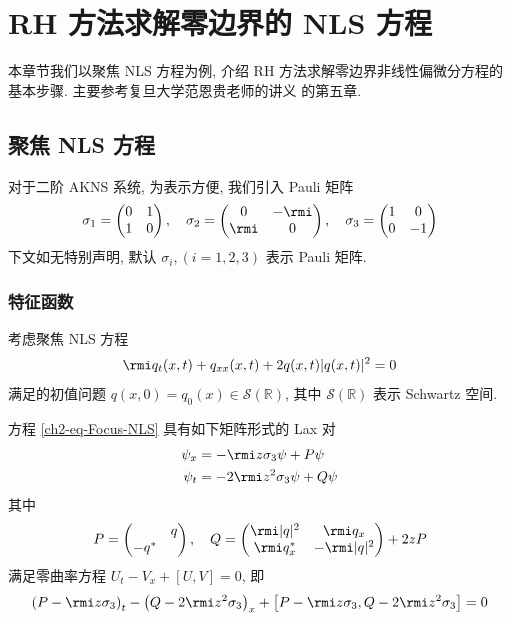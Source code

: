 \chapter{RH 方法求解零边界的 NLS 方程}\label{ch2-ZC-NLS}
本章节我们以聚焦 NLS 方程为例, 介绍 RH 方法求解零边界非线性偏微分方程的基本步骤. 主要参考复旦大学范恩贵老师的讲义 \cite{Fan-RH} 的第五章.
\section{聚焦 NLS 方程}
对于二阶 AKNS 系统, 为表示方便, 我们引入 Pauli 矩阵
\begin{equation}
    \sigma_{1} = \begin{pmatrix}
        0 & 1 \\
        1 & 0
    \end{pmatrix}, \quad
    \sigma_{2} = \begin{pmatrix}
        0    & -\rmi \\
        \rmi & 0
    \end{pmatrix}, \quad
    \sigma_{3} = \begin{pmatrix}
        1 & 0  \\
        0 & -1
    \end{pmatrix}
\end{equation}
下文如无特别声明, 默认 $ \sigma_{i}, (i = 1,2,3) $ 表示 Pauli 矩阵.
\subsection{特征函数}

考虑聚焦 NLS 方程
\begin{equation}
    \rmi q_{t}(x,t) + q_{xx}(x,t) + 2q(x,t)|q(x,t)|^{2} = 0 \label{ch2-eq-Focus-NLS}
\end{equation}
满足的初值问题 $q(x,0) = q_{0}(x) \in \mathcal{S}(\mathbb{R})$, 其中 $ \mathcal{S}(\mathbb{R}) $ 表示 Schwartz 空间.

方程 \eqref{ch2-eq-Focus-NLS} 具有如下矩阵形式的 Lax 对
\begin{align}
    \psi_{x} & = -\rmi z \sigma_{3} \psi + P \psi \label{ch2-eq-Focus-NLS-Lax-x}     \\
    \psi_{t} & = -2 \rmi z^2 \sigma_{3} \psi + Q \psi \label{ch2-eq-Focus-NLS-Lax-t}
\end{align}
其中
\begin{equation*}
    P = \begin{pmatrix}
         & q \\ -q^{*} &
    \end{pmatrix}, \quad
    Q = \begin{pmatrix}
        \rmi |q|^2 & \rmi q_{x} \\ \rmi q_{x}^{*} & -\rmi |q|^2
    \end{pmatrix} + 2 z P
\end{equation*}
满足零曲率方程 $U_{t} - V_{x} + [U, V] = 0 $, 即
\begin{equation}
    \left(P - \rmi z \sigma_{3}\right)_{t} - \left(Q - 2 \rmi z^2 \sigma_{3}\right)_{x} + \left[P - \rmi z \sigma_{3}, Q - 2 \rmi z^2 \sigma_{3} \right] = 0
\end{equation}

